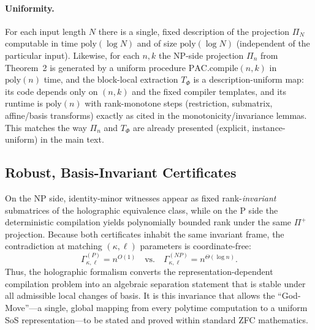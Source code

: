 \documentclass[12pt]{article}
\theoremstyle{definition}
\theoremstyle{definition}
\theoremstyle{remark}
\theoremstyle{remark}
\begin{document}
\paragraph{Uniformity.}
For each input length $N$ there is a single, fixed description of the projection $\Pi_N$ computable in time $\mathrm{poly}(\log N)$ and of size $\mathrm{poly}(\log N)$ (independent of the particular input). Likewise, for each $n,k$ the NP-side projection $\Pi_n$ from Theorem~2 is generated by a uniform procedure $\mathrm{PAC}.\mathrm{compile}(n,k)$ in $\mathrm{poly}(n)$ time, and the block-local extraction $T_\Phi$ is a description-uniform map: its code depends only on $(n,k)$ and the fixed compiler templates, and its runtime is $\mathrm{poly}(n)$ with rank-monotone steps (restriction, submatrix, affine/basis transforms) exactly as cited in the monotonicity/invariance lemmas. This matches the way $\Pi_n$ and $T_\Phi$ are already presented (explicit, instance-uniform) in the main text.

\subsection{Robust, Basis-Invariant Certificates}
On the NP side, identity-minor witnesses appear as fixed
rank-\emph{invariant} submatrices of the holographic equivalence class,
while on the P side the deterministic compilation yields polynomially bounded
rank under the same $\Pi^+$ projection.
Because both certificates inhabit the same invariant frame,
the contradiction at matching $(\kappa,\ell)$ parameters is coordinate-free:
\[
  \Gamma_{\kappa,\ell}^{(P)} = n^{O(1)}
  \quad\text{vs.}\quad
  \Gamma_{\kappa,\ell}^{(NP)} = n^{\Theta(\log n)}.
\]
Thus, the holographic formalism converts the
representation-dependent compilation problem into an algebraic separation
statement that is stable under all admissible local changes of basis.
It is this invariance that allows the ``God-Move''---a single, global
mapping from every polytime computation to a uniform SoS representation---to
be stated and proved within standard ZFC mathematics.
\end{document}
